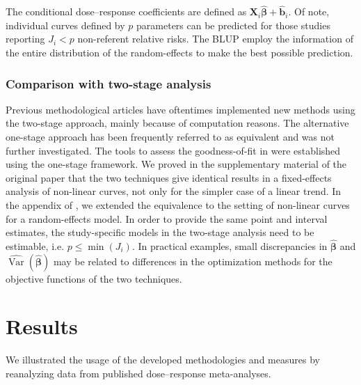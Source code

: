\documentclass[11pt,a4paper,twoside,openany]{book}\usepackage{knitr}
\DeclareMathOperator{\Var}{Var}
\begin{document}
{{The conditional dose--response coefficients are defined as $\mathbf{X}_i\hat{\boldsymbol{\beta}} + \hat {\mathbf{b}}_i$. Of note, individual curves defined by $p$ parameters can be predicted for those studies reporting $J_i < p$ non-referent relative risks. The BLUP employ the information of the entire distribution of the random-effects to make the best possible prediction.

\subsection{Comparison with two-stage analysis}

Previous methodological articles have oftentimes implemented new methods using the two-stage approach, mainly because of computation reasons. The alternative one-stage approach has been frequently referred to as equivalent and was not further investigated. The tools to assess the goodness-of-fit in  were established using the one-stage framework. We proved in the supplementary material of the original paper that the two techniques give identical results in a fixed-effects analysis of non-linear curves, not only for the simpler case of a linear trend. In the appendix of , we extended the equivalence to the setting of non-linear curves for a random-effects model. In order to provide the same point and interval estimates, the study-specific models in the two-stage analysis need to be estimable, i.e. $p \le \min(J_i)$. In practical examples, small discrepancies in $\boldsymbol{\hat \beta}$ and $\widehat{\Var} \left( \boldsymbol{\hat \beta} \right)$ may be related to differences in the optimization methods for the objective functions of the two techniques.


%

\chapter{Results}

We illustrated the usage of the developed methodologies and measures by reanalyzing data from published dose--response meta-analyses. 

}}
\end{document}
